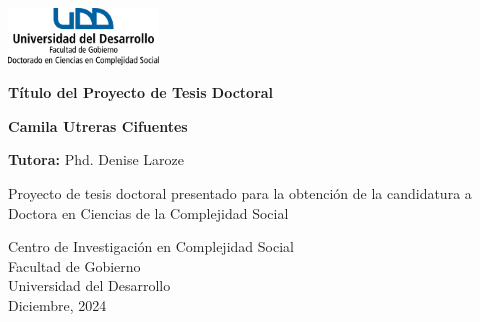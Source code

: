 \documentclass[12pt,a4paper]{article}
\begin{document}
\begin{titlepage}
    \begin{center}
    \includegraphics[width=0.3\textwidth]{Logo.png}
        \vspace*{1cm}
        
        \Large{\textbf{Título del Proyecto de Tesis Doctoral}}
        
        \vspace{1.5cm}
        
        \textbf{Camila Utreras Cifuentes}
        \vspace{0.5cm}
        
        \textbf{Tutora:} Phd. Denise Laroze
        
        
        \vfill
        
        Proyecto de tesis doctoral presentado para la obtención de la candidatura a Doctora en Ciencias de la Complejidad Social
        
        \vspace{0.8cm}
        
        
        
        \vspace{0.8cm}
        
        Centro de Investigación en Complejidad Social \\
        Facultad de Gobierno \\
        Universidad del Desarrollo \\
        Diciembre, 2024
        
    \end{center}
\end{titlepage}



%


%
%
\end{document}
